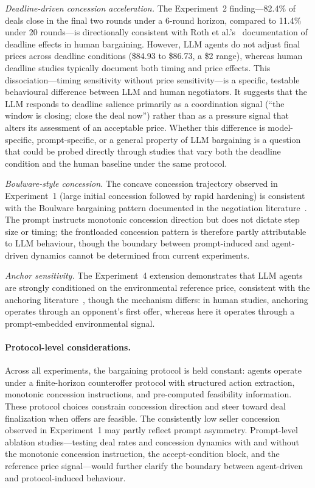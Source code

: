 \emph{Deadline-driven concession acceleration.}  The Experiment~2 finding---82.4\% of deals close in the final two rounds under a 6-round horizon, compared to 11.4\% under 20 rounds---is directionally consistent with Roth et al.'s~\cite{roth1988deadline} documentation of deadline effects in human bargaining.  However, LLM agents do not adjust final prices across deadline conditions (\$84.93 to \$86.73, a \$2 range), whereas human deadline studies typically document both timing and price effects.  This dissociation---timing sensitivity without price sensitivity---is a specific, testable behavioural difference between LLM and human negotiators.  It suggests that the LLM responds to deadline salience primarily as a coordination signal (``the window is closing; close the deal now'') rather than as a pressure signal that alters its assessment of an acceptable price.  Whether this difference is model-specific, prompt-specific, or a general property of LLM bargaining is a question that could be probed directly through studies that vary both the deadline condition and the human baseline under the same protocol.

\emph{Boulware-style concession.}  The concave concession trajectory observed in Experiment~1 (large initial concession followed by rapid hardening) is consistent with the Boulware bargaining pattern documented in the negotiation literature~\cite{raiffa1982}.  The prompt instructs monotonic concession direction but does not dictate step size or timing; the frontloaded concession pattern is therefore partly attributable to LLM behaviour, though the boundary between prompt-induced and agent-driven dynamics cannot be determined from current experiments.

\emph{Anchor sensitivity.}  The Experiment~4 extension demonstrates that LLM agents are strongly conditioned on the environmental reference price, consistent with the anchoring literature~\cite{tversky1974,galinsky2001}, though the mechanism differs: in human studies, anchoring operates through an opponent's first offer, whereas here it operates through a prompt-embedded environmental signal.

\paragraph{Protocol-level considerations.}
Across all experiments, the bargaining protocol is held constant: agents operate under a finite-horizon counteroffer protocol with structured action extraction, monotonic concession instructions, and pre-computed feasibility information.  These protocol choices constrain concession direction and steer toward deal finalization when offers are feasible.  The consistently low seller concession observed in Experiment~1 may partly reflect prompt asymmetry.  Prompt-level ablation studies---testing deal rates and concession dynamics with and without the monotonic concession instruction, the accept-condition block, and the reference price signal---would further clarify the boundary between agent-driven and protocol-induced behaviour.
